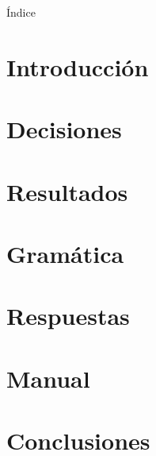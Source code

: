 \documentclass[11pt, a4paper]{article}
\begin{document}


\maketitle
\newpage
Índice
\tableofcontents
\newpage

\section{Introducción}


\section{Decisiones}


\section{Resultados}


\section{Gramática}


\section{Respuestas}


\section{Manual}


\section{Conclusiones}

\end{document}
